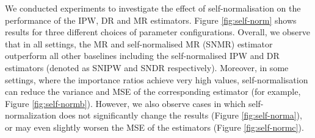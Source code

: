 We conducted experiments to investigate the effect of self-normalisation on the performance of the IPW, DR and MR estimators. Figure \ref{fig:self-norm} shows results for three different choices of parameter configurations. Overall, we observe that in all settings, the MR and self-normalised MR (SNMR) estimator outperform all other baselines including the self-normalised IPW and DR estimators (denoted as SNIPW and SNDR respectively). Moreover, in some settings, where the importance ratios achieve very high values, self-normalisation can reduce the variance and MSE of the corresponding estimator (for example, Figure \ref{fig:self-normb}). However, we also observe cases in which self-normalization does not significantly change the results (Figure \ref{fig:self-norma}), or may even slightly worsen the MSE of the estimators (Figure \ref{fig:self-normc}). 